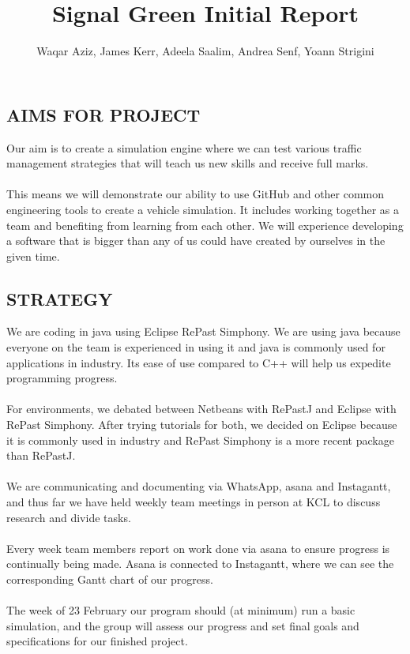 \documentclass[11pt]{article}
\begin{document}
\title{Signal Green Initial Report}

\author{Waqar Aziz, James Kerr, Adeela Saalim, Andrea Senf, Yoann Strigini}

\maketitle 

\section*{}

\subsection*{AIMS FOR PROJECT}



Our aim is to create a simulation engine where we can test various traffic management 
strategies that will teach us new skills and receive full marks. 
\\ \\
This means we will demonstrate our ability to use GitHub and other common engineering 
tools to create a vehicle simulation. It includes working together as a team and 
benefiting from learning from each other. We will experience developing a software that 
is bigger than any of us could have created by ourselves in the given time. 


\subsection*{STRATEGY}

We are coding in java using Eclipse RePast Simphony. We are using java because everyone 
on the team is experienced in using it and java is commonly used for applications in industry. 
Its ease of use compared to C++ will help us expedite programming progress.
\\ \\
 For environments, we debated between Netbeans with RePastJ and Eclipse with RePast 
Simphony. After trying tutorials for both, we decided on Eclipse because it is commonly used 
in industry and RePast Simphony is a more recent package than RePastJ.
\\ \\
We are communicating and documenting via WhatsApp, asana and Instagantt, and thus 
far we have held weekly team meetings in person at KCL to discuss research and divide tasks.
\\ \\
Every week team members report on work done via asana to ensure progress is continually 
being made. Asana is connected to Instagantt, where we can see the corresponding Gantt
chart of our progress.
\\ \\
The week of 23 February our program should (at minimum) run a basic simulation, and the 
group will assess our progress and set final goals and specifications for our finished 
project.
\end{document}
